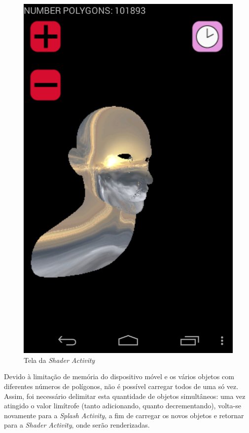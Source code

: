 	\begin{figure}[ht]
	\centering
		\includegraphics[keepaspectratio=true,scale=0.2]{figuras/shader_act.png}
	\caption{Tela da \textit{Shader Activity}}
	\label{shader_act}
	\end{figure}

	Devido à limitação de memória do dispositivo móvel e os vários objetos com diferentes números de polígonos, não é possível carregar todos de uma só vez. Assim, foi necessário delimitar esta quantidade de objetos simultâneos: uma vez atingido o valor limítrofe (tanto adicionando, quanto decrementando), volta-se novamente para a \textit{Splash Activity}, a fim de carregar os novos objetos e retornar para a \textit{Shader Activity}, onde serão renderizadas.

